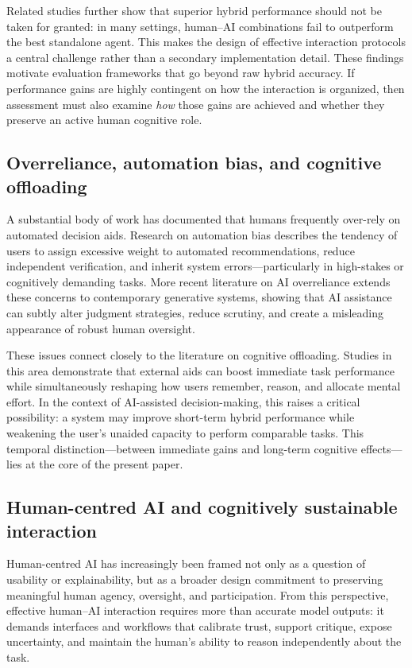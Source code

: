 \documentclass[11pt,a4paper]{article}
\begin{document}
Related studies further show that superior hybrid performance should not be taken for granted: in many settings, human--AI combinations fail to outperform the best standalone agent. This makes the design of effective interaction protocols a central challenge rather than a secondary implementation detail. These findings motivate evaluation frameworks that go beyond raw hybrid accuracy. If performance gains are highly contingent on how the interaction is organized, then assessment must also examine \emph{how} those gains are achieved and whether they preserve an active human cognitive role.

\subsection{Overreliance, automation bias, and cognitive offloading}

A substantial body of work has documented that humans frequently over-rely on automated decision aids. Research on automation bias describes the tendency of users to assign excessive weight to automated recommendations, reduce independent verification, and inherit system errors---particularly in high-stakes or cognitively demanding tasks. More recent literature on AI overreliance extends these concerns to contemporary generative systems, showing that AI assistance can subtly alter judgment strategies, reduce scrutiny, and create a misleading appearance of robust human oversight.

These issues connect closely to the literature on cognitive offloading. Studies in this area demonstrate that external aids can boost immediate task performance while simultaneously reshaping how users remember, reason, and allocate mental effort. In the context of AI-assisted decision-making, this raises a critical possibility: a system may improve short-term hybrid performance while weakening the user's unaided capacity to perform comparable tasks. This temporal distinction---between immediate gains and long-term cognitive effects---lies at the core of the present paper.

\subsection{Human-centred AI and cognitively sustainable interaction}

Human-centred AI has increasingly been framed not only as a question of usability or explainability, but as a broader design commitment to preserving meaningful human agency, oversight, and participation. From this perspective, effective human--AI interaction requires more than accurate model outputs: it demands interfaces and workflows that calibrate trust, support critique, expose uncertainty, and maintain the human's ability to reason independently about the task.
\end{document}
